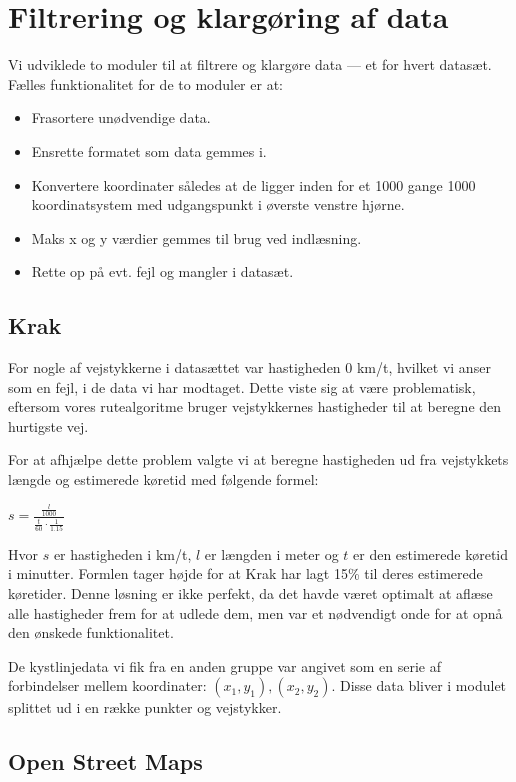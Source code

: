 \section{Filtrering og klargøring af data}
\label{sec:filtreringOgKlargoeringAfData}

Vi udviklede to moduler til at filtrere og klargøre data --- et for hvert datasæt. Fælles funktionalitet for de to moduler er at:

\begin{itemize}
	\item Frasortere unødvendige data.
	\item Ensrette formatet som data gemmes i.
	\item Konvertere koordinater således at de ligger inden for et 1000 gange 1000 koordinatsystem med udgangspunkt i øverste venstre hjørne.
	\item Maks x og y værdier gemmes til brug ved indlæsning.
	\item Rette op på evt. fejl og mangler i datasæt.
\end{itemize}

\subsection{Krak}
\label{sec:krak}

For nogle af vejstykkerne i datasættet var hastigheden 0 km/t, hvilket vi anser som en fejl, i de data vi har modtaget. Dette viste sig at være problematisk, eftersom vores rutealgoritme bruger vejstykkernes hastigheder til at beregne den hurtigste vej.

For at afhjælpe dette problem valgte vi at beregne hastigheden ud fra vejstykkets længde og estimerede køretid med følgende formel:

\vspace{1ex}
$s = \frac{\frac{l}{1000}}{\frac{t}{60} \cdot \frac{1}{1.15}}$
\vspace{1ex}

Hvor $s$ er hastigheden i km/t, $l$ er længden i meter og $t$ er den estimerede køretid i minutter. Formlen tager højde for at Krak har lagt 15\% til deres estimerede køretider. Denne løsning er ikke perfekt, da det havde været optimalt at aflæse alle hastigheder frem for at udlede dem, men var et nødvendigt onde for at opnå den ønskede funktionalitet.

De kystlinjedata vi fik fra en anden gruppe var angivet som en serie af forbindelser mellem koordinater: $(x_1, y_1), (x_2, y_2)$. Disse data bliver i modulet splittet ud i en række punkter og vejstykker.

\subsection{Open Street Maps}
\label{sec:openStreetMaps}
